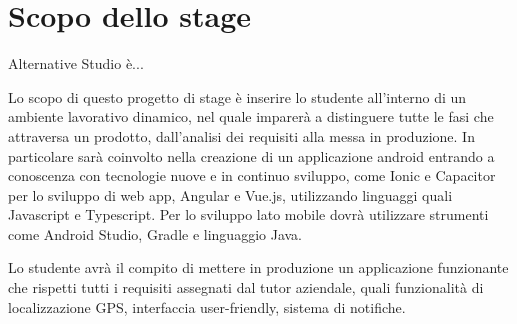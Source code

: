 \section*{Scopo dello stage}
Alternative Studio è...

Lo scopo di questo progetto di stage è inserire lo studente all'interno di un ambiente lavorativo dinamico, nel quale imparerà a distinguere tutte le fasi che attraversa un prodotto, dall'analisi dei requisiti alla messa in produzione. In particolare sarà coinvolto nella creazione di un applicazione android entrando a conoscenza con tecnologie nuove e in continuo sviluppo, come Ionic e Capacitor per lo sviluppo di web app, Angular e Vue.js, utilizzando linguaggi quali Javascript e Typescript. Per lo sviluppo lato mobile dovrà utilizzare strumenti come Android Studio, Gradle e linguaggio Java.

Lo studente avrà il compito di mettere in produzione un applicazione funzionante che rispetti tutti i requisiti assegnati dal tutor aziendale, quali funzionalità di localizzazione GPS, interfaccia user-friendly, sistema di notifiche.

